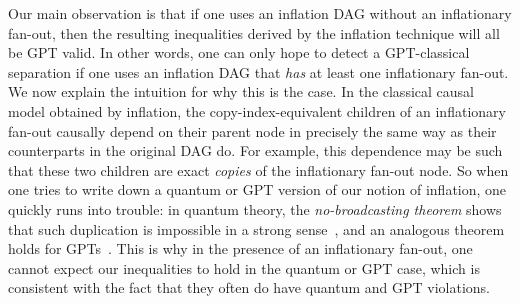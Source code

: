 \documentclass[aps,english,10pt,superscriptaddress,onecolumn,twoside,longbibliography,pra,floatfix,fleqn,nofootinbib]{revtex4-1}%
\theoremstyle{definition}
\newcounter{example}[section]
\begin{document}
Our main observation is that if one uses an inflation DAG without an inflationary fan-out, then the resulting inequalities derived by the inflation technique will all be GPT valid. In other words, one can only hope to detect a GPT-classical separation if one uses an inflation DAG that \emph{has} at least one inflationary fan-out. We now explain the intuition for why this is the case. 
In the classical causal model obtained by inflation, the copy-index-equivalent children of an inflationary fan-out causally depend on their parent node in precisely the same way as their counterparts in the original DAG do. For example, this dependence may be such that these two children are exact \emph{copies} of the inflationary fan-out node. So when one tries to write down a quantum or GPT version of our notion of inflation, one quickly runs into trouble: in quantum theory, the {\em no-broadcasting theorem} shows that such duplication is impossible in a strong sense~\cite{NoCloningQuantum1996}, and an analogous theorem holds for GPTs~\cite{NoCloningGeneral2006}. This is why in the presence of an inflationary fan-out, one cannot expect our inequalities to hold in the quantum or GPT case, which is consistent with the fact that they often do have quantum and GPT violations.
\end{document}
